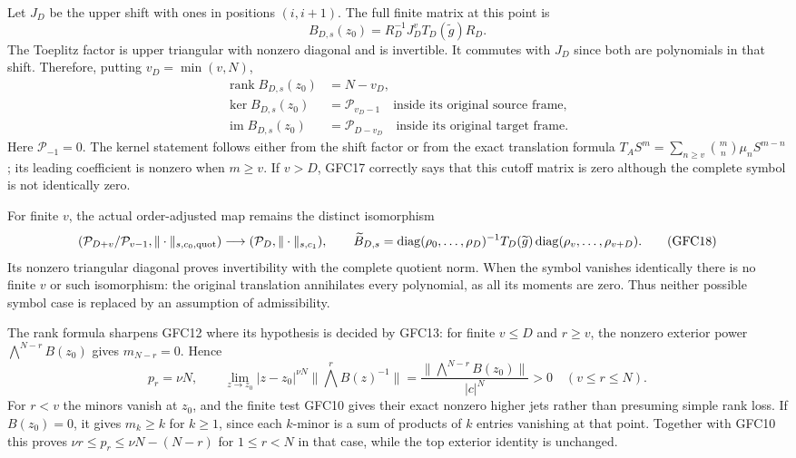 Let $J_D$ be the upper shift with ones in positions $(i,i+1)$.
The full finite matrix at this point is
\[
 B_{D,s}(z_0)=R_D^{-1}J_D^vT_D(\widetilde g)R_D.
 \tag{GFC16}
\]
The Toeplitz factor is upper triangular with nonzero diagonal and
is invertible. It commutes with $J_D$ since both are polynomials
in that shift. Therefore, putting $v_D=\min(v,N)$,
\[
 \begin{split}
 \operatorname{rank}B_{D,s}(z_0)&=N-v_D,\\
 \ker B_{D,s}(z_0)&=\mathcal P_{v_D-1}
               \quad\text{inside its original source frame},\\
 \operatorname{im}B_{D,s}(z_0)&=\mathcal P_{D-v_D}
               \quad\text{inside its original target frame}.
 \end{split}\tag{GFC17}
\]
Here $\mathcal P_{-1}=0$. The kernel statement follows either
from the shift factor or from the exact translation formula
$T_AS^m=\sum_{n\ge v}\binom mn\mu_nS^{m-n}$; its leading
coefficient is nonzero when $m\ge v$.
If $v>D$, GFC17 correctly says that this cutoff matrix is zero
although the complete symbol is not identically zero.

For finite $v$, the actual order-adjusted map remains the distinct
isomorphism
\[
 (\mathcal P_{D+v}/\mathcal P_{v-1},\|\cdot\|_{s,c_0,\rm quot})
       \longrightarrow(\mathcal P_D,\|\cdot\|_{s,c_1}),\qquad
 \widetilde B_{D,s}=
 \operatorname{diag}(\rho_0,\ldots,\rho_D)^{-1}
 T_D(\widetilde g)
 \operatorname{diag}(\rho_v,\ldots,\rho_{v+D}).
 \tag{GFC18}
\]
Its nonzero triangular diagonal proves invertibility with the complete
quotient norm. When the symbol vanishes identically there is no
finite $v$ or such isomorphism: the original translation annihilates
every polynomial, as all its moments are zero. Thus neither possible
symbol case is replaced by an assumption of admissibility.

The rank formula sharpens GFC12 where its hypothesis is decided by
GFC13: for finite $v\le D$ and $r\ge v$, the nonzero exterior
power $\bigwedge^{N-r}B(z_0)$ gives $m_{N-r}=0$. Hence
\[
 p_r=\nu N,\qquad
 \lim_{z\to z_0}|z-z_0|^{\nu N}\|\bigwedge^rB(z)^{-1}\|
   =\frac{\|\bigwedge^{N-r}B(z_0)\|}{|c|^N}>0
              \quad(v\le r\le N).
 \tag{GFC19}
\]
For $r<v$ the minors vanish at $z_0$, and the finite test GFC10
gives their exact nonzero higher jets rather than presuming simple
rank loss. If $B(z_0)=0$, it gives $m_k\ge k$ for $k\ge1$,
since each $k$-minor is a sum of products of $k$ entries vanishing
at that point. Together with GFC10 this proves
$\nu r\le p_r\le\nu N-(N-r)$ for $1\le r<N$ in that case,
while the top exterior identity is unchanged.

